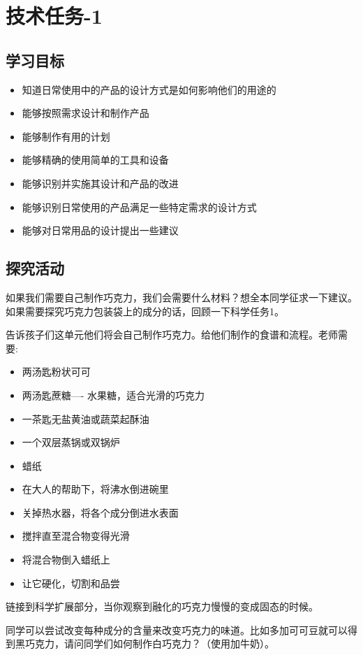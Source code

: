 \chapter{技术任务-1}


\section{学习目标}
 \begin{itemize}
    \item 知道日常使用中的产品的设计方式是如何影响他们的用途的
    \item 能够按照需求设计和制作产品
    \item 能够制作有用的计划
    \item 能够精确的使用简单的工具和设备
    \item 能够识别并实施其设计和产品的改进
    \item 能够识别日常使用的产品满足一些特定需求的设计方式
    \item 能够对日常用品的设计提出一些建议
  \end{itemize}  
   


\section{探究活动}
    如果我们需要自己制作巧克力，我们会需要什么材料？想全本同学征求一下建议。如果需要探究巧克力包装袋上的成分的话，回顾一下科学任务1。\par
    告诉孩子们这单元他们将会自己制作巧克力。给他们制作的食谱和流程。老师需要:\par
    \begin{itemize}
      \item 两汤匙粉状可可
      \item 两汤匙蔗糖—- 水果糖，适合光滑的巧克力
      \item 一茶匙无盐黄油或蔬菜起酥油
      \item 一个双层蒸锅或双锅炉
      \item 蜡纸
    \end{itemize}
    \par
    \begin{itemize}
      \item 在大人的帮助下，将沸水倒进碗里
      \item 关掉热水器，将各个成分倒进水表面
      \item 搅拌直至混合物变得光滑 
      \item 将混合物倒入蜡纸上
      \item 让它硬化，切割和品尝 
    \end{itemize}
    链接到科学扩展部分，当你观察到融化的巧克力慢慢的变成固态的时候。\par
    同学可以尝试改变每种成分的含量来改变巧克力的味道。比如多加可可豆就可以得到黑巧克力，请问同学们如何制作白巧克力？（使用加牛奶）。



